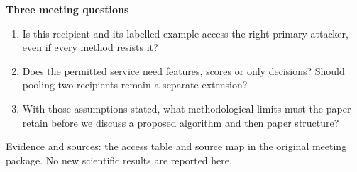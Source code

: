 \documentclass[10pt]{article}
\begin{document}
\textbf{Three meeting questions}\par
\begin{enumerate}\setlength{\itemsep}{3pt}
\item Is this recipient and its labelled-example access the right primary attacker, even if every method resists it?
\item Does the permitted service need features, scores or only decisions? Should pooling two recipients remain a separate extension?
\item With those assumptions stated, what methodological limits must the paper retain before we discuss a proposed algorithm and then paper structure?
\end{enumerate}
\vfill{\footnotesize Evidence and sources: the access table and source map in the original meeting package. No new scientific results are reported here.}
\end{document}

